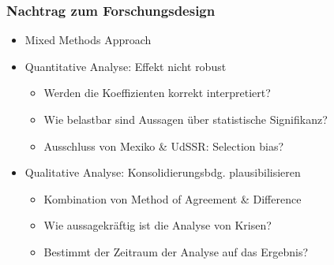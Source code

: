 \documentclass{beamer}
\begin{document}
\begin{frame}
  \frametitle{Nachtrag zum Forschungsdesign}
  \begin{itemize}
    \item Mixed Methods Approach
    \item Quantitative Analyse: Effekt nicht robust
    \begin{itemize}
      \item Werden die Koeffizienten korrekt interpretiert?
      \item Wie belastbar sind Aussagen über statistische Signifikanz?
      \item Ausschluss von Mexiko \& UdSSR: Selection bias?
    \end{itemize}
    \item Qualitative Analyse: Konsolidierungsbdg. plausibilisieren
    \begin{itemize}
      \item Kombination von Method of Agreement \& Difference
      \item Wie aussagekräftig ist die Analyse von Krisen?
      \item Bestimmt der Zeitraum der Analyse auf das Ergebnis?
    \end{itemize}
  \end{itemize}
\end{frame}
\end{document}
